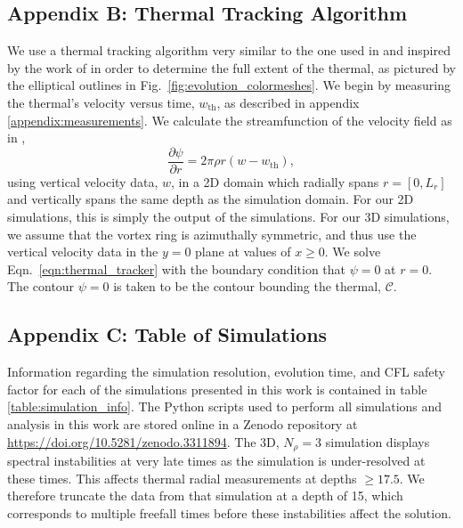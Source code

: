 \subsection{Appendix B: Thermal Tracking Algorithm}
\label{appendix:tracking}
We use a thermal tracking algorithm very similar to the one used in  \cite{lecoanet&jeevanjee2018} and inspired by the work of \cite{romps&all2015} in order to determine the full extent of the thermal, as pictured by the elliptical outlines in Fig.~\ref{fig:evolution_colormeshes}. 
We begin by measuring the thermal's velocity versus time, $w_{\text{th}}$, as described in appendix \ref{appendix:measurements}. 
We calculate the streamfunction of the velocity field as in \cite{romps&all2015},
\begin{equation}
\frac{\partial \psi}{\partial r} = 2\pi \rho r (w - w_{\text{th}}),
\label{eqn:thermal_tracker}
\end{equation}
using vertical velocity data, $w$, in a 2D domain which radially spans $r = [0, L_r]$ and vertically spans the same depth as the simulation domain.
For our 2D simulations, this is simply the output of the simulations.
For our 3D simulations, we assume that the vortex ring is azimuthally symmetric, and thus use the vertical velocity data in the $y = 0$ plane at values of $x \geq 0$.
We solve Eqn.~\ref{eqn:thermal_tracker} with the boundary condition that $\psi = 0$ at $r = 0$. 
The contour $\psi = 0$ is taken to be the contour bounding the thermal, $\mathcal{C}$.

\subsection{Appendix C: Table of Simulations}
\label{appendix:table}
Information regarding the simulation resolution, evolution time, and CFL safety factor for each of the simulations presented in this work is contained in table \ref{table:simulation_info}.
The Python scripts used to perform all simulations and analysis in this work are stored online in a Zenodo repository \cite{supp_andersetall2019b} at \url{https://doi.org/10.5281/zenodo.3311894}.
The 3D, $N_\rho = 3$ simulation displays spectral instabilities at very late times as the simulation is under-resolved at these times.
This affects thermal radial measurements at depths $\geq 17.5$.
We therefore truncate the data from that simulation at a depth of 15, which corresponds to multiple freefall times before these instabilities affect the solution.

